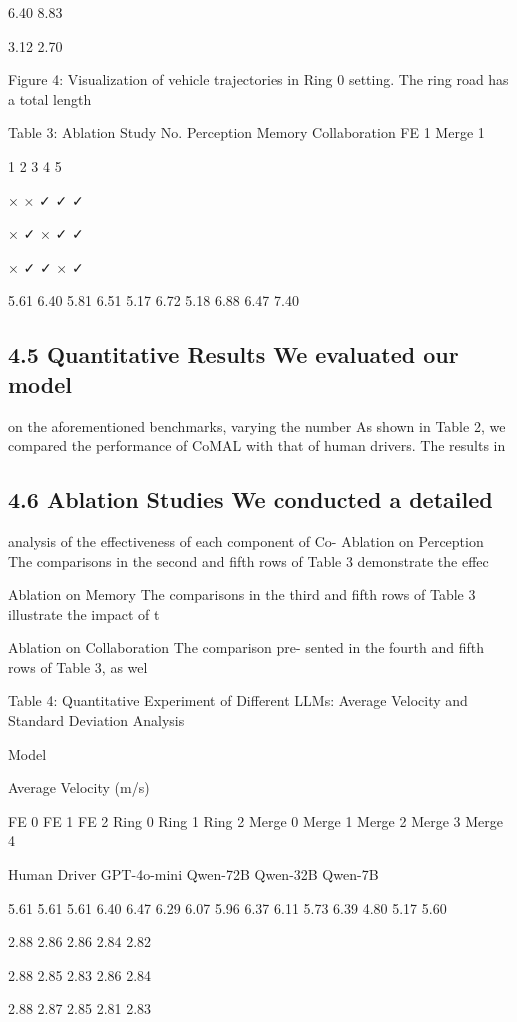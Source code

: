 \documentclass[12pt]{article}
\begin{document}
6.40
8.83


3.12
2.70


Figure 4: Visualization of vehicle trajectories in Ring 0 setting. The ring road has a total length 


Table 3: Ablation Study
No. Perception Memory Collaboration FE 1 Merge 1


1
2
3
4
5


×
×
✓
✓
✓


×
✓
×
✓
✓


×
✓
✓
×
✓


5.61 6.40
5.81 6.51
5.17 6.72
5.18 6.88
6.47 7.40


\subsection{4.5 Quantitative Results We evaluated our model}

on the aforementioned benchmarks, varying the number
As shown in Table 2, we compared the performance
of CoMAL with that of human drivers. The results in


\subsection{4.6 Ablation Studies We conducted a detailed}

analysis of the effectiveness of each component of Co-
Ablation on Perception The comparisons in the
second and fifth rows of Table 3 demonstrate the
effec


Ablation on Memory The comparisons in the
third and fifth rows of Table 3 illustrate the impact
of t


Ablation on Collaboration The comparison pre-
sented in the fourth and fifth rows of Table 3, as wel


Table 4: Quantitative Experiment of Different LLMs: Average Velocity and Standard Deviation Analysis


Model


Average Velocity (m/s)


FE 0 FE 1 FE 2 Ring 0 Ring 1 Ring 2 Merge 0 Merge 1 Merge 2 Merge 3 Merge 4


Human Driver
GPT-4o-mini
Qwen-72B
Qwen-32B
Qwen-7B


5.61
5.61
5.61
6.40 6.47 6.29
6.07
5.96
6.37
6.11
5.73
6.39
4.80
5.17
5.60


2.88
2.86
2.86
2.84
2.82


2.88
2.85
2.83
2.86
2.84


2.88
2.87
2.85
2.81
2.83
\end{document}
